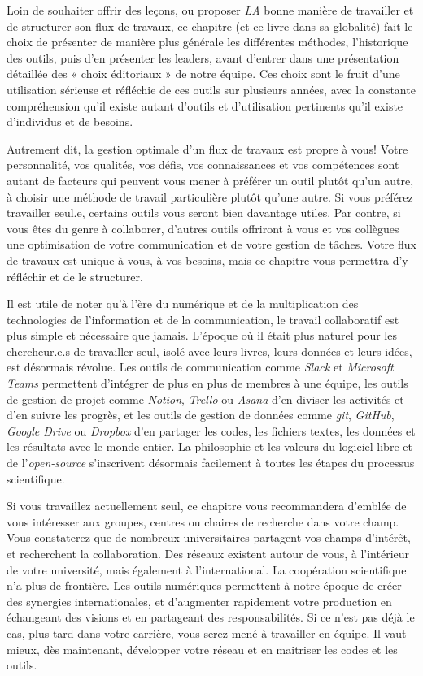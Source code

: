 \documentclass[
  letterpaper,
  DIV=11,
  numbers=noendperiod]{scrreprt}
\begin{document}
Loin de souhaiter offrir des leçons, ou proposer \emph{LA} bonne manière
de travailler et de structurer son flux de travaux, ce chapitre (et ce
livre dans sa globalité) fait le choix de présenter de manière plus
générale les différentes méthodes, l'historique des outils, puis d'en
présenter les leaders, avant d'entrer dans une présentation détaillée
des « choix éditoriaux » de notre équipe. Ces choix sont le fruit d'une
utilisation sérieuse et réfléchie de ces outils sur plusieurs années,
avec la constante compréhension qu'il existe autant d'outils et
d'utilisation pertinents qu'il existe d'individus et de besoins.

Autrement dit, la gestion optimale d'un flux de travaux est propre à
vous! Votre personnalité, vos qualités, vos défis, vos connaissances et
vos compétences sont autant de facteurs qui peuvent vous mener à
préférer un outil plutôt qu'un autre, à choisir une méthode de travail
particulière plutôt qu'une autre. Si vous préférez travailler seul.e,
certains outils vous seront bien davantage utiles. Par contre, si vous
êtes du genre à collaborer, d'autres outils offriront à vous et vos
collègues une optimisation de votre communication et de votre gestion de
tâches. Votre flux de travaux est unique à vous, à vos besoins, mais ce
chapitre vous permettra d'y réfléchir et de le structurer.

Il est utile de noter qu'à l'ère du numérique et de la multiplication
des technologies de l'information et de la communication, le travail
collaboratif est plus simple et nécessaire que jamais. L'époque où il
était plus naturel pour les chercheur.e.s de travailler seul, isolé avec
leurs livres, leurs données et leurs idées, est désormais révolue. Les
outils de communication comme \emph{Slack} et \emph{Microsoft Teams}
permettent d'intégrer de plus en plus de membres à une équipe, les
outils de gestion de projet comme \emph{Notion}, \emph{Trello} ou
\emph{Asana} d'en diviser les activités et d'en suivre les progrès, et
les outils de gestion de données comme \emph{git}, \emph{GitHub},
\emph{Google Drive} ou \emph{Dropbox} d'en partager les codes, les
fichiers textes, les données et les résultats avec le monde entier. La
philosophie et les valeurs du logiciel libre et de l'\emph{open-source}
s'inscrivent désormais facilement à toutes les étapes du processus
scientifique.

Si vous travaillez actuellement seul, ce chapitre vous recommandera
d'emblée de vous intéresser aux groupes, centres ou chaires de recherche
dans votre champ. Vous constaterez que de nombreux universitaires
partagent vos champs d'intérêt, et recherchent la collaboration. Des
réseaux existent autour de vous, à l'intérieur de votre université, mais
également à l'international. La coopération scientifique n'a plus de
frontière. Les outils numériques permettent à notre époque de créer des
synergies internationales, et d'augmenter rapidement votre production en
échangeant des visions et en partageant des responsabilités. Si ce n'est
pas déjà le cas, plus tard dans votre carrière, vous serez mené à
travailler en équipe. Il vaut mieux, dès maintenant, développer votre
réseau et en maitriser les codes et les outils.
\end{document}
